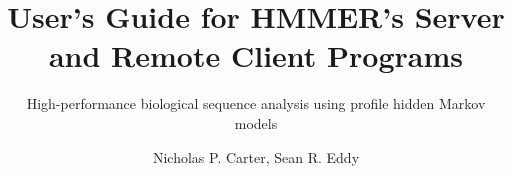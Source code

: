 \title{User's Guide for HMMER's Server and Remote Client Programs}

\subtitle{High-performance biological sequence analysis using profile hidden Markov models}

\author{Nicholas P. Carter, Sean R. Eddy}


